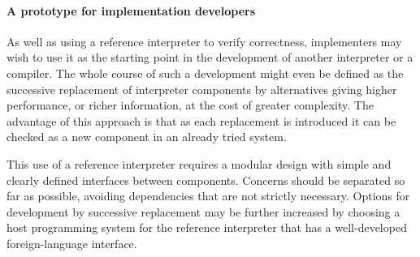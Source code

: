 \paragraph{A prototype for implementation developers}
As well as using a reference interpreter to verify correctness,
implementers may wish to use it as the starting point in the
development of another interpreter or a compiler.
The whole course of such a development might even be defined as
the successive replacement of interpreter components by
alternatives giving higher performance, or richer information,
at the cost of greater complexity.
The advantage of this approach is that as each replacement
is introduced it can be checked as a new component in an already
tried system.

This use of a reference interpreter requires a
modular design with simple and clearly defined interfaces
between components.
Concerns should be separated so far as possible, avoiding
dependencies that are not strictly necessary.
Options for development by successive replacement may be further
increased by choosing a host programming system for the reference
interpreter that has a well-developed foreign-language interface. 


